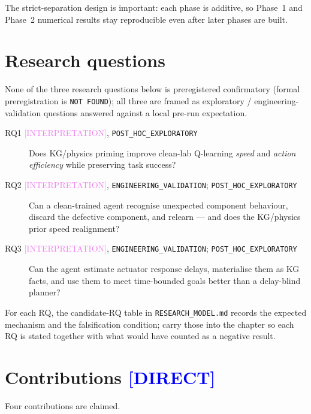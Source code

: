 \documentclass[12pt, a4paper, oneside]{memoir}
\newcommand{\evDirect}{\textcolor{blue}{[DIRECT]}}
\newcommand{\evInterp}{\textcolor{violet}{[INTERPRETATION]}}
\newcommand{\rsPHE}{\texttt{POST\_HOC\_EXPLORATORY}}
\newcommand{\rsEV}{\texttt{ENGINEERING\_VALIDATION}}
\begin{document}
The strict-separation design is important: each phase is additive, so
Phase~1 and Phase~2 numerical results stay reproducible even after later
phases are built.

\section{Research questions}
\label{sec:intro-rqs}

None of the three research questions below is preregistered confirmatory
(formal preregistration is \texttt{NOT FOUND}); all three are framed as
exploratory / engineering-validation questions answered against a local
pre-run expectation.

\begin{description}
  \item[RQ1 \evInterp, \rsPHE]
    Does KG/physics priming improve clean-lab Q-learning \emph{speed} and
    \emph{action efficiency} while preserving task success?

  \item[RQ2 \evInterp, \rsEV; \rsPHE]
    Can a clean-trained agent recognise unexpected component behaviour,
    discard the defective component, and relearn --- and does the KG/physics
    prior speed realignment?

  \item[RQ3 \evInterp, \rsEV; \rsPHE]
    Can the agent estimate actuator response delays, materialise them as KG
    facts, and use them to meet time-bounded goals better than a delay-blind
    planner?
\end{description}

For each RQ, the candidate-RQ table in \texttt{RESEARCH\_MODEL.md} records
the expected mechanism and the falsification condition; carry those into the
chapter so each RQ is stated together with what would have counted as a
negative result.

\section{Contributions \evDirect}
\label{sec:intro-contributions}

Four contributions are claimed.
\end{document}
